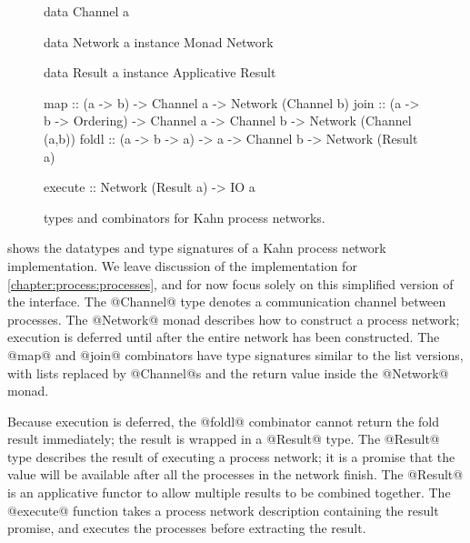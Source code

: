 \begin{figure}
\begin{haskell}
data Channel a

data Network a
instance Monad Network

data Result  a
instance Applicative Result

map     :: (a -> b) -> Channel a
        -> Network (Channel b)
join    :: (a -> b -> Ordering) -> Channel a -> Channel b
        -> Network (Channel (a,b))
foldl   :: (a -> b -> a) -> a -> Channel b
        -> Network (Result a)

execute :: Network (Result a) -> IO a
\end{haskell}
\caption[Types and combinators for Kahn process networks]{types and combinators for Kahn process networks.}
\label{figs/kpn/combinators}
\end{figure}

 shows the datatypes and type signatures of a Kahn process network implementation.
We leave discussion of the implementation for \cref{chapter:process:processes}, and for now focus solely on this simplified version of the interface.
The @Channel@ type denotes a communication channel between processes.
The @Network@ monad describes how to construct a process network; execution is deferred until after the entire network has been constructed.
The @map@ and @join@ combinators have type signatures similar to the list versions, with lists replaced by @Channel@s and the return value inside the @Network@ monad.

Because execution is deferred, the @foldl@ combinator cannot return the fold result immediately; the result is wrapped in a @Result@ type.
The @Result@ type describes the result of executing a process network; it is a promise that the value will be available after all the processes in the network finish.
The @Result@ is an applicative functor to allow multiple results to be combined together.
The @execute@ function takes a process network description containing the result promise, and executes the processes before extracting the result.



